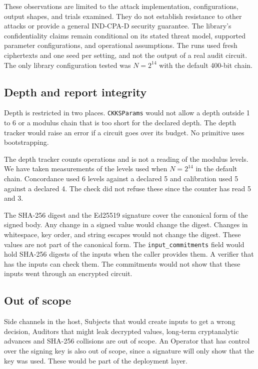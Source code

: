 \documentclass[10pt,a4paper]{article}
\begin{document}
These observations are limited to the attack implementation, configurations, output shapes, and trials examined. They do not establish resistance to other attacks or provide a general IND-CPA-D security guarantee. The library's confidentiality claims remain conditional on its stated threat model, supported parameter configurations, and operational assumptions. The runs used fresh ciphertexts and one seed per setting, and not the output of a real audit circuit. The only library configuration tested was $N=2^{14}$ with the default 400-bit chain.

\subsection{Depth and report integrity}

Depth is restricted in two places. \texttt{CKKSParams} would not allow a depth outside 1 to 6 or a modulus chain that is too short for the declared depth. The depth tracker would raise an error if a circuit goes over its budget. No primitive uses bootstrapping.

The depth tracker counts operations and is not a reading of the modulus levels. We have taken measurements of the levels used when $N=2^{14}$ in the default chain. Concordance used 6 levels against a declared 5 and calibration used 5 against a declared 4. The check did not refuse these since the counter has read 5 and 3.

The SHA-256 digest and the Ed25519 signature cover the canonical form of the signed body. Any change in a signed value would change the digest. Changes in whitespace, key order, and string escapes would not change the digest. These values are not part of the canonical form. The \texttt{input\_commitments} field would hold SHA-256 digests of the inputs when the caller provides them. A verifier that has the inputs can check them. The commitments would not show that these inputs went through an encrypted circuit.

\subsection{Out of scope}

Side channels in the host, Subjects that would create inputs to get a wrong decision, Auditors that might leak decrypted values, long-term cryptanalytic advances and SHA-256 collisions are out of scope. An Operator that has control over the signing key is also out of scope, since a signature will only show that the key was used. These would be part of the deployment layer.
\end{document}
